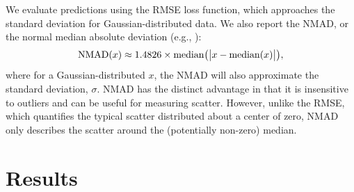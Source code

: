 \documentclass[fleqn,usenatbib]{mnras}
\newcommand{\eg}{e.g.}
\newcommand{\citeeg}[1]{(\eg, \citealt{#1})}
\begin{document}
We evaluate predictions using the RMSE loss function, which approaches the standard deviation for Gaussian-distributed data. We also report the NMAD, or the normal median absolute deviation \citeeg{Ilbert2009, Dahlen2013, Molino2017}:
\begin{equation}
{\rm NMAD}(x) \approx 1.4826 \times {\rm median} \big (\big|x - {\rm median }(x) \big|\big ),
\end{equation}
where for a Gaussian-distributed $x$, the NMAD will also approximate the standard deviation, $\sigma$.
NMAD has the distinct advantage in that it is insensitive to outliers and can be useful for measuring scatter.
However, unlike the RMSE, which quantifies the typical scatter distributed about a center of zero, NMAD only describes the scatter around the (potentially non-zero) median.

\section{Results}\label{sec:results}
\end{document}

